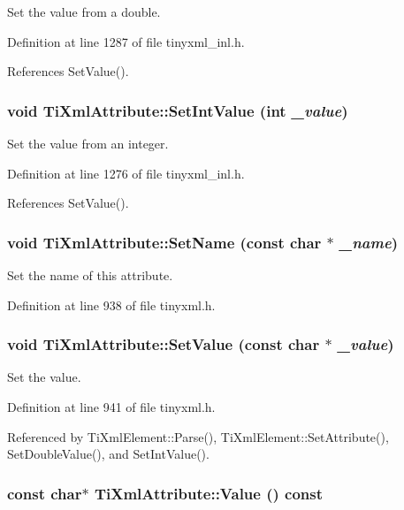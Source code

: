 Set the value from a double. 

Definition at line 1287 of file tinyxml\_\-inl.h.

References SetValue().\hypertarget{class_ti_xml_attribute_a7e065df640116a62ea4f4b7da5449cc8}{
\subsubsection[{SetIntValue}]{\setlength{\rightskip}{0pt plus 5cm}void TiXmlAttribute::SetIntValue (int {\em \_\-value})}}
\label{class_ti_xml_attribute_a7e065df640116a62ea4f4b7da5449cc8}


Set the value from an integer. 

Definition at line 1276 of file tinyxml\_\-inl.h.

References SetValue().\hypertarget{class_ti_xml_attribute_ab7fa3d21ff8d7c5764cf9af15b667a99}{
\subsubsection[{SetName}]{\setlength{\rightskip}{0pt plus 5cm}void TiXmlAttribute::SetName (const char $\ast$ {\em \_\-name})}}
\label{class_ti_xml_attribute_ab7fa3d21ff8d7c5764cf9af15b667a99}


Set the name of this attribute. 

Definition at line 938 of file tinyxml.h.\hypertarget{class_ti_xml_attribute_a2dae44178f668b3cb48101be4f2236a0}{
\subsubsection[{SetValue}]{\setlength{\rightskip}{0pt plus 5cm}void TiXmlAttribute::SetValue (const char $\ast$ {\em \_\-value})}}
\label{class_ti_xml_attribute_a2dae44178f668b3cb48101be4f2236a0}


Set the value. 

Definition at line 941 of file tinyxml.h.

Referenced by TiXmlElement::Parse(), TiXmlElement::SetAttribute(), SetDoubleValue(), and SetIntValue().\hypertarget{class_ti_xml_attribute_a0f874490eac8ca00ee0070765d0e97e3}{
\subsubsection[{Value}]{\setlength{\rightskip}{0pt plus 5cm}const char$\ast$ TiXmlAttribute::Value () const}}
\label{class_ti_xml_attribute_a0f874490eac8ca00ee0070765d0e97e3}


